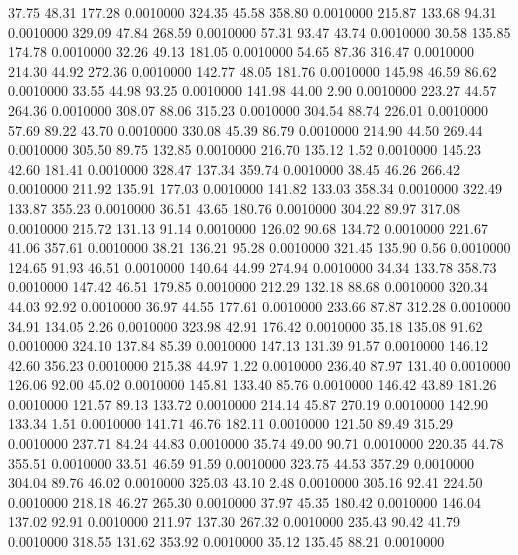   37.75   48.31  177.28   0.0010000
 324.35   45.58  358.80   0.0010000
 215.87  133.68   94.31   0.0010000
 329.09   47.84  268.59   0.0010000
  57.31   93.47   43.74   0.0010000
  30.58  135.85  174.78   0.0010000
  32.26   49.13  181.05   0.0010000
  54.65   87.36  316.47   0.0010000
 214.30   44.92  272.36   0.0010000
 142.77   48.05  181.76   0.0010000
 145.98   46.59   86.62   0.0010000
  33.55   44.98   93.25   0.0010000
 141.98   44.00    2.90   0.0010000
 223.27   44.57  264.36   0.0010000
 308.07   88.06  315.23   0.0010000
 304.54   88.74  226.01   0.0010000
  57.69   89.22   43.70   0.0010000
 330.08   45.39   86.79   0.0010000
 214.90   44.50  269.44   0.0010000
 305.50   89.75  132.85   0.0010000
 216.70  135.12    1.52   0.0010000
 145.23   42.60  181.41   0.0010000
 328.47  137.34  359.74   0.0010000
  38.45   46.26  266.42   0.0010000
 211.92  135.91  177.03   0.0010000
 141.82  133.03  358.34   0.0010000
 322.49  133.87  355.23   0.0010000
  36.51   43.65  180.76   0.0010000
 304.22   89.97  317.08   0.0010000
 215.72  131.13   91.14   0.0010000
 126.02   90.68  134.72   0.0010000
 221.67   41.06  357.61   0.0010000
  38.21  136.21   95.28   0.0010000
 321.45  135.90    0.56   0.0010000
 124.65   91.93   46.51   0.0010000
 140.64   44.99  274.94   0.0010000
  34.34  133.78  358.73   0.0010000
 147.42   46.51  179.85   0.0010000
 212.29  132.18   88.68   0.0010000
 320.34   44.03   92.92   0.0010000
  36.97   44.55  177.61   0.0010000
 233.66   87.87  312.28   0.0010000
  34.91  134.05    2.26   0.0010000
 323.98   42.91  176.42   0.0010000
  35.18  135.08   91.62   0.0010000
 324.10  137.84   85.39   0.0010000
 147.13  131.39   91.57   0.0010000
 146.12   42.60  356.23   0.0010000
 215.38   44.97    1.22   0.0010000
 236.40   87.97  131.40   0.0010000
 126.06   92.00   45.02   0.0010000
 145.81  133.40   85.76   0.0010000
 146.42   43.89  181.26   0.0010000
 121.57   89.13  133.72   0.0010000
 214.14   45.87  270.19   0.0010000
 142.90  133.34    1.51   0.0010000
 141.71   46.76  182.11   0.0010000
 121.50   89.49  315.29   0.0010000
 237.71   84.24   44.83   0.0010000
  35.74   49.00   90.71   0.0010000
 220.35   44.78  355.51   0.0010000
  33.51   46.59   91.59   0.0010000
 323.75   44.53  357.29   0.0010000
 304.04   89.76   46.02   0.0010000
 325.03   43.10    2.48   0.0010000
 305.16   92.41  224.50   0.0010000
 218.18   46.27  265.30   0.0010000
  37.97   45.35  180.42   0.0010000
 146.04  137.02   92.91   0.0010000
 211.97  137.30  267.32   0.0010000
 235.43   90.42   41.79   0.0010000
 318.55  131.62  353.92   0.0010000
  35.12  135.45   88.21   0.0010000
